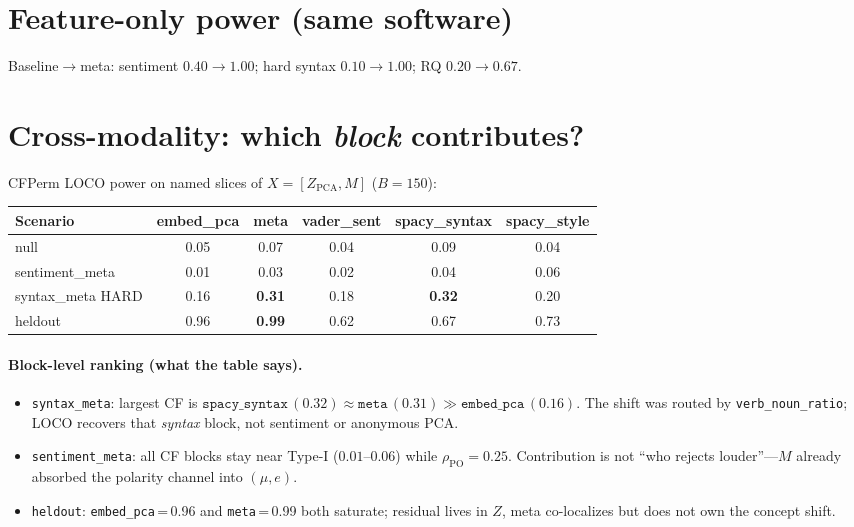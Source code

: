 \documentclass[11pt]{article}
\begin{document}
\section{Feature-only power (same software)}
Baseline$\to$meta: sentiment $0.40\to\mathbf{1.00}$; hard syntax
$0.10\to\mathbf{1.00}$; RQ $0.20\to\mathbf{0.67}$.

\section{Cross-modality: which \emph{block} contributes?}
CFPerm LOCO power on named slices of $X=[Z_{\mathrm{PCA}},M]$ ($B{=}150$):
\begin{center}
\begin{tabular}{lccccc}
\toprule
Scenario & embed\_pca & meta & vader\_sent & spacy\_syntax & spacy\_style \\
\midrule
null & 0.05 & 0.07 & 0.04 & 0.09 & 0.04 \\
sentiment\_meta & 0.01 & 0.03 & 0.02 & 0.04 & 0.06 \\
syntax\_meta HARD & 0.16 & \textbf{0.31} & 0.18 & \textbf{0.32} & 0.20 \\
heldout & 0.96 & \textbf{0.99} & 0.62 & 0.67 & 0.73 \\
\bottomrule
\end{tabular}
\end{center}

\paragraph{Block-level ranking (what the table says).}
\begin{itemize}[leftmargin=*]
  \item \texttt{syntax\_meta}: largest CF is
        $\texttt{spacy\_syntax}\,(0.32)\approx\texttt{meta}\,(0.31)
        \gg \texttt{embed\_pca}\,(0.16)$.
        The shift was routed by \texttt{verb\_noun\_ratio}; LOCO recovers
        that \emph{syntax} block, not sentiment or anonymous PCA.
  \item \texttt{sentiment\_meta}: all CF blocks stay near Type-I
        ($0.01$--$0.06$) while $\rho_{\mathrm{PO}}{=}0.25$.
        Contribution is not ``who rejects louder''---$M$ already absorbed
        the polarity channel into $(\mu,e)$.
  \item \texttt{heldout}: \texttt{embed\_pca}\,{=}\,0.96 and
        \texttt{meta}\,{=}\,0.99 both saturate; residual lives in $Z$,
        meta co-localizes but does not own the concept shift.
\end{itemize}
\end{document}
